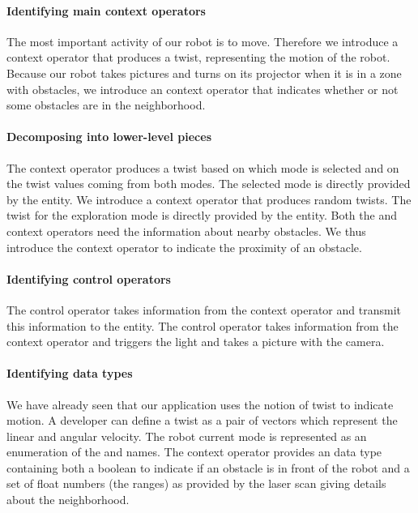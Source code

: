 \paragraph*{Identifying main context operators}
The most important activity of our robot is to move. Therefore we
introduce a  context operator that produces a twist,
representing the motion of the robot. Because our robot takes pictures and
turns on its projector when it is in a zone with obstacles, we
introduce an  context operator that indicates whether
or not some obstacles are in the neighborhood.

\paragraph*{Decomposing into lower-level pieces}
The  context operator produces a twist based on which mode
is selected and on the twist values coming from both modes. The
selected mode is directly provided by the  entity. We
introduce a  context operator that produces random
twists. The twist for the exploration mode is directly provided by the
 entity. Both the  and
 context operators need the information about nearby
obstacles. We thus introduce the  context
operator to indicate the proximity of an obstacle.

\paragraph*{Identifying control operators}
The  control operator takes information from the
 context operator and transmit this information to the
 entity. The  control operator takes
information from the  context operator and triggers the
light and takes a picture with the camera.

\paragraph*{Identifying data types}
We have already seen that our application uses the notion of twist to
indicate motion. A developer can define a twist as a pair of vectors
which represent the linear and angular velocity. The robot current
mode is represented as an enumeration of the  and
 names. The  context operator
provides an  data type containing both a boolean to
indicate if an obstacle is in front of the robot and a set of float
numbers (the ranges) as provided by the laser scan giving details
about the neighborhood.

